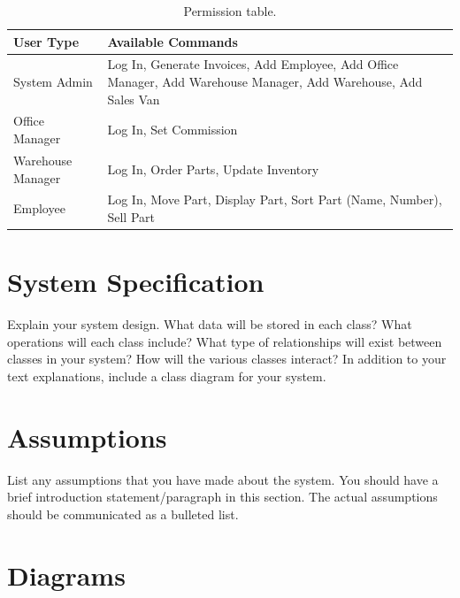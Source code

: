\documentclass{report}
\begin{document}
\begin{table}
  \begin{center}
      \begin{tabular}{ | l | p{8cm} |}
      \hline
      User Type & Available Commands \\ \hline
      System Admin & Log In, Generate Invoices, Add Employee, Add Office Manager, Add Warehouse Manager, Add Warehouse, Add Sales Van \\ \hline
      Office Manager & Log In, Set Commission\\ \hline
      Warehouse Manager & Log In, Order Parts, Update Inventory \\ \hline
      Employee & Log In, Move Part, Display Part, Sort Part (Name, Number), Sell Part \\
      \hline
      \end{tabular}
  \end{center}
  \caption{Permission table.}
\end{table}

\section{System Specification}

Explain your system design. What data will be stored in each class?  What operations will each class include?  What type of relationships will exist between classes in your system? How will the various classes interact? In addition to your text explanations, include a class diagram for your system.\par

\section{Assumptions}

List any assumptions that you have made about the system. You should have a brief introduction statement/paragraph in this section. The actual assumptions should be communicated as a bulleted list.\par

\section{Diagrams}
\end{document}
